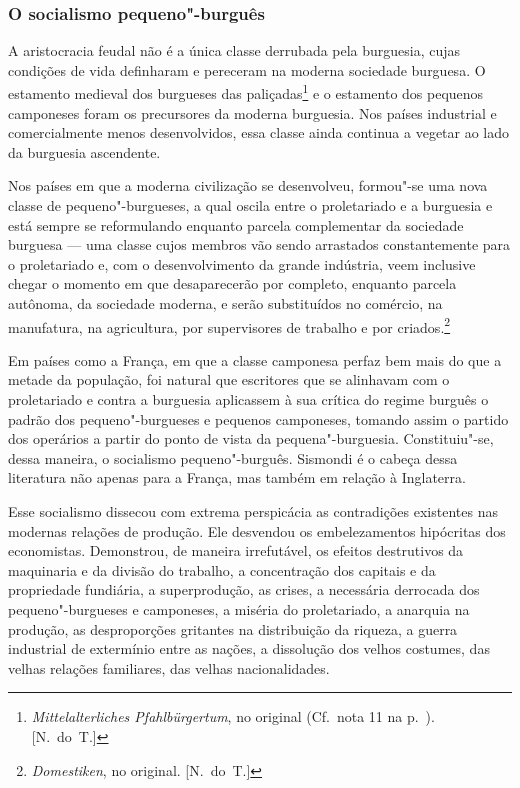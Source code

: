 \subsubsection{O socialismo pequeno"-burguês}

A aristocracia feudal não é a única classe derrubada pela
burguesia, cujas condições de vida definharam e pereceram na moderna
sociedade burguesa. O estamento medieval dos burgueses das
paliçadas\footnote{ \textit{Mittelalterliches Pfahlbürgertum},
no original (Cf.~nota 11 na p.~\pageref{8}). [N.~do~T.]} e o estamento dos pequenos camponeses
foram os precursores da moderna burguesia. Nos países industrial e
comercialmente menos desenvolvidos, essa classe ainda continua a
vegetar ao lado da burguesia ascendente.

Nos países em que a moderna civilização se desenvolveu,
formou"-se uma nova classe de pequeno"-burgueses, a qual oscila entre
o proletariado e a burguesia e está sempre se reformulando enquanto
parcela complementar da sociedade burguesa  ---  uma classe cujos membros
vão sendo arrastados constantemente para o proletariado e, com o
desenvolvimento da grande indústria, veem inclusive chegar o momento em
que desaparecerão por completo, enquanto parcela autônoma, da sociedade
moderna, e serão substituídos no comércio, na manufatura, na
agricultura, por supervisores de trabalho e por
criados.\footnote{ \textit{Domestiken}, no original. [N.~do~T.]}

Em países como a França, em que a classe camponesa perfaz bem mais do
que a metade da população, foi natural que escritores que se alinhavam
com o proletariado e contra a burguesia aplicassem à sua crítica do
regime burguês o padrão dos pequeno"-burgueses e pequenos camponeses,
tomando assim o partido dos operários a partir do ponto de vista da
pequena"-burguesia. Constituiu"-se, dessa maneira, o socialismo
pequeno"-burguês. Sismondi é o cabeça dessa literatura não apenas para
a França, mas também em relação à Inglaterra.

Esse socialismo dissecou com extrema perspicácia as contradições
existentes nas modernas relações de produção. Ele desvendou os
embelezamentos hipócritas dos economistas. Demonstrou, de maneira
irrefutável, os efeitos destrutivos da maquinaria e da divisão do
trabalho, a concentração dos capitais e da propriedade fundiária, a
superprodução, as crises, a necessária derrocada dos pequeno"-burgueses
e camponeses, a miséria do proletariado, a anarquia na produção, as
desproporções gritantes na distribuição da riqueza, a guerra industrial
de extermínio entre as nações, a dissolução dos velhos costumes, das
velhas relações familiares, das velhas nacionalidades.

